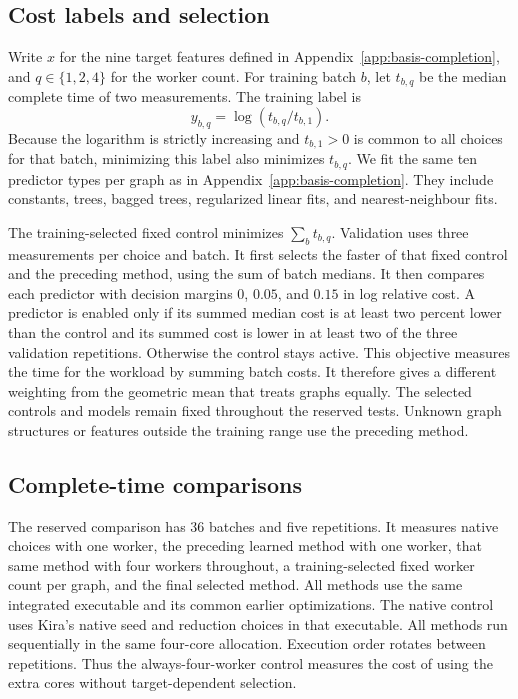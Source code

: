 \subsection{Cost labels and selection}
Write $x$ for the nine target features defined in
Appendix~\ref{app:basis-completion}, and $q\in\{1,2,4\}$ for the worker
count. For training batch $b$, let $t_{b,q}$ be the median complete time of
two measurements. The training label is
\begin{equation}
 y_{b,q}=\log(t_{b,q}/t_{b,1}).
 \label{eq:thread-label}
\end{equation}
Because the logarithm is strictly increasing and $t_{b,1}>0$ is common
to all choices for that batch, minimizing this label also minimizes
$t_{b,q}$. We fit the same ten predictor types per graph as in
Appendix~\ref{app:basis-completion}. They include constants, trees,
bagged trees, regularized linear fits, and nearest-neighbour fits.

The training-selected fixed control minimizes $\sum_b t_{b,q}$.
Validation uses three measurements per choice and batch. It first selects
the faster of that fixed control and the preceding method, using the sum
of batch medians. It then compares each predictor with decision margins
$0$, $0.05$, and $0.15$ in log relative cost. A predictor is enabled only
if its summed median cost is at least two percent lower than the control
and its summed cost is lower in at least two of the three validation
repetitions. Otherwise the control stays active. This objective measures the time for the workload by summing batch costs. It therefore gives a different weighting from the geometric mean that treats graphs equally. The selected controls and models remain fixed throughout the reserved tests.
Unknown graph structures or features outside the training range use the
preceding method.

\subsection{Complete-time comparisons}
The reserved comparison has 36 batches and five repetitions. It measures
native choices with one worker, the preceding learned method with one
worker, that same method with four workers throughout, a training-selected
fixed worker count per graph, and the final selected method. All methods use the same integrated executable and its common earlier
optimizations. The native control uses Kira's native seed and reduction
choices in that executable. All methods run sequentially in the same
four-core allocation. Execution order rotates
between repetitions. Thus the always-four-worker control measures the
cost of using the extra cores without target-dependent selection.

